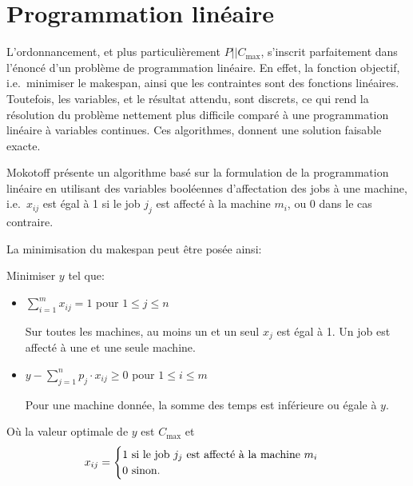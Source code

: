 \documentclass[a4paper,12pt]{report}
\theoremstyle{plain}				%
\theoremstyle{definition}				%
\newcommand\problemGrahamP{$P||C_{\max}$\xspace}
\newcommand{\tdi}[1]{\todo[inline]{{#1}}{}}
\newcommand{\lp}[1]{\todo[author=LP,color=yellow,inline]{#1}}
\begin{document}
\section{Programmation linéaire} \label{sec:programmationLineaire}

L'ordonnancement, et plus particulièrement \problemGrahamP, s'inscrit
parfaitement dans l'énoncé d'un problème de programmation linéaire.
En effet, la fonction objectif, i.e.\ minimiser le makespan, ainsi que
les contraintes sont des fonctions linéaires.
Toutefois, les variables, et le résultat attendu, sont discrets, ce qui
rend la résolution du problème nettement plus difficile comparé à une
programmation linéaire à variables continues.
Ces algorithmes, donnent une solution faisable exacte.


Mokotoff \cite{mokoto1999scheduling} présente un algorithme basé sur
la formulation de la programmation linéaire en utilisant des
variables booléennes d'affectation des jobs à une machine, i.e.\
$x_{ij}$ est égal à 1 si le job $j_j$ est affecté à la machine $m_i$, ou
0 dans le cas contraire.

\bigskip
La minimisation du makespan peut être posée ainsi:

Minimiser $y$ tel que:

\begin{itemize}
\item $\sum_{i=1}^{m}x_{ij}=1$ \quad pour $1 \leq j \leq n$

Sur toutes les machines, au moins un et un seul $x_j$ est égal à 1.
Un job est affecté à une et une seule machine.

\item $y-\sum_{j=1}^{n}p_j \cdot x_{ij} \geq 0$ \quad pour $1 \leq i \leq m$

Pour une machine donnée, la somme des temps est inférieure ou égale à $y$.
\end{itemize}

\bigskip
Où la valeur optimale de $y$ est $C_{\max}$
et
\[
  x_{ij} =
  \begin{cases}
    1 \textnormal{ si le job $j_j$ est affecté à la machine $m_i$}\\
    0 \textnormal{ sinon.}\\
  \end{cases}
\]
\end{document}
